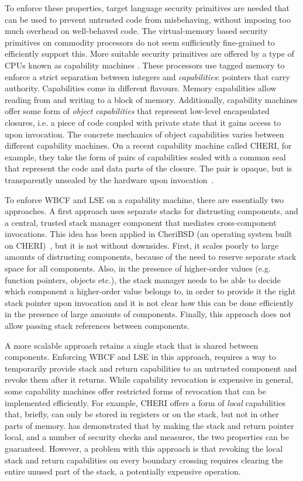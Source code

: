 \documentclass[acmsmall,review,anonymous]{acmart}\settopmatter{printfolios=true,printccs=false,printacmref=false}
\begin{document}
To enforce these properties, target language security primitives are needed that can be used to prevent untrusted code from misbehaving, without imposing too much overhead on well-behaved code.
The virtual-memory based security primitives on commodity processors do not seem sufficiently fine-grained to efficiently support this.
More suitable security primitives are offered by a type of CPUs known as capability machines \citep{levy_capability-based_1984,watson_cheri:_2015}.
These processors use tagged memory to enforce a strict separation between integers and \emph{capabilities}: pointers that carry authority.
Capabilities come in different flavours.
Memory capabilities allow reading from and writing to a block of memory.
Additionally, capability machines offer some form of \emph{object capabilities} that represent low-level encapsulated closures, i.e. a piece of code coupled with private state that it gains access to upon invocation.
The concrete mechanics of object capabilities varies between different capability machines.
On a recent capability machine called CHERI, for example, they take the form of pairs of capabilities sealed with a common seal that represent the code and data parts of the closure.
The pair is opaque, but is transparently unsealed by the hardware upon invocation~\citep{watson_capability_2015}.

To enforce WBCF and LSE on a capability machine, there are essentially two approaches.
A first approach uses separate stacks for distrusting components, and a central, trusted stack manager component that mediates cross-component invocations.
This idea has been applied in CheriBSD (an operating system built on CHERI)~\citep{watson_capability_2015}, but it is not without downsides.
First, it scales poorly to large amounts of distrusting components, because of the need to reserve separate stack space for all components.
Also, in the presence of higher-order values (e.g. function pointers, objects etc.), the stack manager needs to be able to decide which component a higher-order value belongs to, in order to provide it the right stack pointer upon invocation and it is not clear how this can be done efficiently in the presence of large amounts of components.
Finally, this approach does not allow passing stack references between components.

A more scalable approach retains a single stack that is shared between components.
Enforcing WBCF and LSE in this approach, requires a way to temporarily provide stack and return capabilities to an untrusted component and revoke them after it returns.
While capability revocation is expensive in general, some capability machines offer restricted forms of revocation that can be implemented efficiently.
For example, CHERI offers a form of \emph{local} capabilities that, briefly, can only be stored in registers or on the stack, but not in other parts of memory.
\citet{skorstengaard_reasoning_2017} has demonstrated that by making the stack and return pointer local, and a number of security checks and measures, the two properties can be guaranteed.
However, a problem with this approach is that revoking the local stack and return capabilities on every boundary crossing requires clearing the entire unused part of the stack, a potentially expensive operation.
\end{document}
